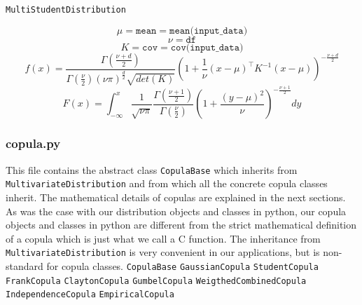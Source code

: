 \documentclass{article}
\begin{document}
  	\texttt{MultiStudentDistribution}

  	\begin{equation*}
  	\mu = \texttt{mean} = \texttt{mean(input\_data)}
  	\end{equation*}
  	\begin{equation*}
  	\nu = \texttt{df}
  	\end{equation*}
  	\begin{equation*}
  	K = \texttt{cov} = \texttt{cov(input\_data)}
  	\end{equation*}
  	\begin{equation*}
  	f(x) = \frac{\Gamma (\frac{\nu +d}{2})}{\Gamma
	 (\frac{\nu}{2})(\nu \pi)^{\frac{d}{2}}\sqrt{det(K)}}\left(1+\frac{1}{\nu}(x-\mu)^\top K^{-1} (x-\mu) \right)^{-\frac{\nu +d}{2}}
  	\end{equation*}
  	\begin{equation*}
  	F(x) = \int_{-\infty}^x \frac{1}{\sqrt{\nu\pi}}\frac{\Gamma(\frac{\nu+1}{2})}{\Gamma(\frac{\nu}{2})}\left(1+\frac{(y-\mu)^2}{\nu}\right)^{-\frac{\nu+1}{2}}dy
  	\end{equation*}


	 \subsubsection{copula.py}
	 This file contains the abstract class \texttt{CopulaBase} which inherits from \texttt{MultivariateDistribution} and from which all the concrete copula classes inherit. The mathematical details of copulas are explained in the next sections. As was the case with our distribution objects and classes in python, our copula objects and classes in python are different from the strict mathematical definition of a copula which is just what we call a C function. The inheritance from \texttt{MultivariateDistribution} is very convenient in our applications, but is non-standard for copula classes.\newline
\newline
	 \texttt{CopulaBase} \newline
	 \texttt{GaussianCopula} \newline
	 \texttt{StudentCopula} \newline
	 \texttt{FrankCopula} \newline
	 \texttt{ClaytonCopula} \newline
	 \texttt{GumbelCopula} \newline
	 \texttt{WeigthedCombinedCopula} \newline
	 \texttt{IndependenceCopula} \newline
	 \texttt{EmpiricalCopula} \newline
\end{document}
